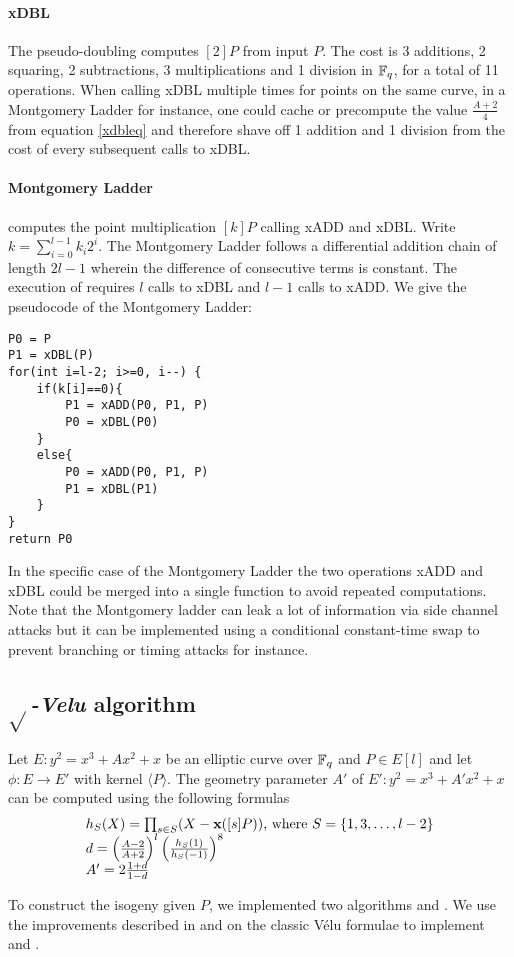 \documentclass[../main.tex]{subfilesubs}
\begin{document}
\paragraph{xDBL}The pseudo-doubling  computes $[2]P$ from input $P$.  The cost is 3 additions, 2 squaring, 2 subtractions, 3 multiplications and 1 division in $\mathbb{F}_q$, for a total of 11 operations. When calling xDBL multiple times for points on the same curve, in a Montgomery Ladder for instance, one could cache or precompute the value $\frac{A+2}{4}$ from equation \eqref{xdbleq} and therefore shave off 1 addition and 1 division from the cost of every subsequent calls to xDBL.

\paragraph{Montgomery Ladder}  computes the point multiplication $[k]P$ calling xADD and xDBL. Write $k=\sum_{i=0}^{l-1}k_i2^i$. The Montgomery Ladder follows a differential addition chain of length $2l-1$ wherein the difference of consecutive terms is constant. The execution of  requires $l$ calls to xDBL and $l-1$ calls to xADD. We give the pseudocode of the Montgomery Ladder:
\begin{verbatim}
P0 = P
P1 = xDBL(P)
for(int i=l-2; i>=0, i--) {
	if(k[i]==0){
		P1 = xADD(P0, P1, P)
		P0 = xDBL(P0)
	}
	else{
		P0 = xADD(P0, P1, P)
		P1 = xDBL(P1)
	}
}
return P0
\end{verbatim}
In the specific case of the Montgomery Ladder the two operations xADD and xDBL could be merged into a single function to avoid repeated computations.
Note that the Montgomery ladder can leak a lot of information via side channel attacks but it can be implemented using a conditional constant-time swap to prevent branching or timing attacks for instance.

\subsection{$\sqrt{}$\textit{-Velu} algorithm}

\begin{lemma}
	Let $E:y^2=x^3+Ax^2+x$ be an elliptic curve over $\mathbb{F}_q$ and $P\in E[l]$ and let $\phi:E\rightarrow E'$ with kernel $\langle P \rangle$.
	The geometry parameter $A'$ of $E' : y^2=x^3+A'x^2+x$ can be computed using the following formulas
	\begin{equation}\label{veluform}\begin{array}{l}
			h_S(X) = \prod_{s\in S}(X-\textbf{x}([s]P))\text{, where }S=\{1,3, \ldots, l-2\} \\
			d = \left(\frac{A-2}{A+2}\right)^l \left( \frac{h_S(1)}{h_S(-1)}\right)^8\\
			A'=2\frac{1+d}{1-d}
		\end{array}\end{equation}

\end{lemma}
To construct the isogeny given $P$, we implemented two algorithms  and . We use the improvements described in \cite{} and \cite{} on the classic Vélu formulae to implement  and .
\end{document}
